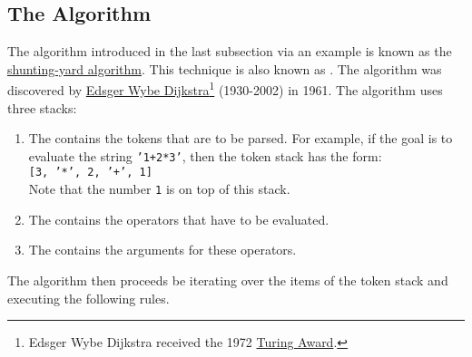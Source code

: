 \subsection{The Algorithm \label{algo-arith}}
The algorithm introduced in the last subsection via an example is known as the 
\href{http://en.wikipedia.org/wiki/Shunting-yard_algorithm}{shunting-yard algorithm}.  
This technique is also known as .
The algorithm was discovered by  \href{http://en.wikipedia.org/wiki/Edsger_Dijkstra}{Edsger Wybe Dijkstra}\footnote{
  Edsger Wybe Dijkstra received the 1972 \href{https://en.wikipedia.org/wiki/Turing_Award}{Turing Award}.
}
(1930-2002) in 1961.   The algorithm uses three stacks:
\begin{enumerate}
\item The  contains the tokens that are to be parsed.  For example,
      if the goal is to evaluate the string \texttt{'1+2*3'}, then the token stack has the form:
      \\[0.2cm]
      \hspace*{1.3cm}
      \texttt{[3, '*', 2, '+', 1]}
      \\[0.2cm]
      Note that the number \texttt{1} is on top of this stack.
\item The  contains the operators that have to be evaluated.
\item The  contains the arguments for these operators.
\end{enumerate}
The algorithm then proceeds be iterating over the items of the token stack and executing the following rules.
